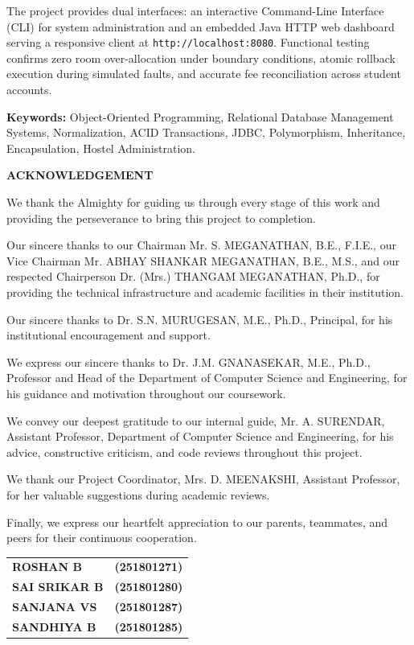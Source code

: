 \documentclass[12pt,a4paper]{report}
\begin{document}
The project provides dual interfaces: an interactive Command-Line Interface (CLI) for system administration and an embedded Java HTTP web dashboard serving a responsive client at \texttt{http://localhost:8080}. Functional testing confirms zero room over-allocation under boundary conditions, atomic rollback execution during simulated faults, and accurate fee reconciliation across student accounts.

\vspace{0.5cm}
\noindent \textbf{Keywords:} Object-Oriented Programming, Relational Database Management Systems, Normalization, ACID Transactions, JDBC, Polymorphism, Inheritance, Encapsulation, Hostel Administration.

\newpage

\begin{center}
{\Large \textbf{ACKNOWLEDGEMENT}\par}
\end{center}
\vspace{0.4cm}

We thank the Almighty for guiding us through every stage of this work and providing the perseverance to bring this project to completion.

Our sincere thanks to our Chairman Mr. S. MEGANATHAN, B.E., F.I.E., our Vice Chairman Mr. ABHAY SHANKAR MEGANATHAN, B.E., M.S., and our respected Chairperson Dr. (Mrs.) THANGAM MEGANATHAN, Ph.D., for providing the technical infrastructure and academic facilities in their institution.

Our sincere thanks to Dr. S.N. MURUGESAN, M.E., Ph.D., Principal, for his institutional encouragement and support.

We express our sincere thanks to Dr. J.M. GNANASEKAR, M.E., Ph.D., Professor and Head of the Department of Computer Science and Engineering, for his guidance and motivation throughout our coursework.

We convey our deepest gratitude to our internal guide, Mr. A. SURENDAR, Assistant Professor, Department of Computer Science and Engineering, for his advice, constructive criticism, and code reviews throughout this project.

We thank our Project Coordinator, Mrs. D. MEENAKSHI, Assistant Professor, for her valuable suggestions during academic reviews.

Finally, we express our heartfelt appreciation to our parents, teammates, and peers for their continuous cooperation.

\vspace{1.5cm}
\noindent
\begin{tabular}{p{7.5cm}l}
\textbf{ROSHAN B} & \textbf{(251801271)} \\
\textbf{SAI SRIKAR B} & \textbf{(251801280)} \\
\textbf{SANJANA VS} & \textbf{(251801287)} \\
\textbf{SANDHIYA B} & \textbf{(251801285)} \\
\end{tabular}
\end{document}
